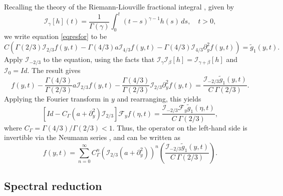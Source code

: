 \documentclass[11pt]{article}
\numberwithin{equation}{section}
\begin{document}
Recalling the theory of the Riemann-Liouville fractional integral \cite{CK}, given by
\begin{equation}
\mathcal{I}_{\gamma}[h](t) = \frac{1}{\Gamma(\gamma)} \int_0^t (t-s)^{\gamma-1} h(s) \, ds, \quad t > 0,\end{equation}
we write equation \eqref{eqresfor} to be
\begin{equation}
C\left( \Gamma(2/3) \mathcal{I}_{2/3} f(y,t) - \Gamma(4/3) a \mathcal{I}_{4/3} f(y,t) - \Gamma(4/3) \mathcal{I}_{4/3} \partial_y^2 f(y,t)\right)=\tilde{g}_{1}(y,t).
\end{equation}
Apply $\mathcal{I}_{-2/3}$ to the equation, using the facts that $\mathcal{I}_{\gamma}\mathcal{I}_{\beta}[h]=\mathcal{I}_{\gamma+\beta}[h]$ and $\mathcal{I}_{0}=I\!d$. The result gives
\begin{equation}
    f(y,t) - \frac{\Gamma(4/3)}{\Gamma(2/3)} a \mathcal{I}_{2/3} f(y,t) - \frac{\Gamma(4/3)}{\Gamma(2/3)} \mathcal{I}_{2/3} \partial_y^2 f(y,t)=\frac{\mathcal{I}_{-2/3}\tilde{g}_{1}(y,t)}{C\ \Gamma(2/3)}.
\end{equation}
Applying the Fourier transform in $y$ and rearranging, this yields
\begin{equation}
    \left[I\!d - C_{\Gamma}(a+\partial^{2}_{y})\mathcal{I}_{2/3} \right] \mathcal{F}_{y}f(\eta,t)=\frac{\mathcal{I}_{-2/3}\mathcal{F}_{y}\tilde{g}_{1}(\eta,t)}{C\ \Gamma(2/3)},
\end{equation}
where $C_{\Gamma}=\Gamma(4/3)/\Gamma(2/3)<1$. Thus, the operator on the left-hand side is invertible via the Neumann series \cite{podlubny1999}, and can be written as
\begin{equation}\label{f(y,t)RL}
    f(y,t)=\sum_{n=0}^{\infty} C_{\Gamma}^{n}(\mathcal{I}_{2/3}(a+\partial_{y}^{2}))^{n}\left(\frac{\mathcal{I}_{-2/3}\tilde{g}_{1}(y,t)}{C\ \Gamma(2/3)} \right).
\end{equation}

\subsection{Spectral reduction}
\end{document}
